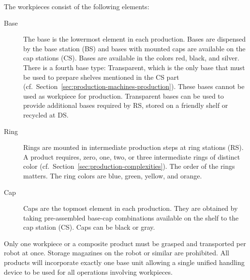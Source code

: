 \documentclass[12pt,twoside]{article}
\newcommand{\refsec}[1]{Section~\ref{#1}}
\begin{document}
\noindent
The workpieces consist of the following elements:
\begin{description}
\item[Base] The base is the lowermost element in each production.
  Bases are dispensed by the base station (BS) and bases with mounted
  caps are available on the cap stations (CS). Bases are available in
  the colors red, black, and silver. There is a fourth base type:
  Transparent, which is the only base that must be used to prepare
  shelves mentioned in the CS part
  (cf.~\refsec{sec:production-machines-production}). These bases
  cannot be used as workpiece for production. Transparent bases can be
  used to provide additional bases required by RS, stored on a
  friendly shelf or recycled at DS.
\item[Ring] Rings are mounted in intermediate production steps at ring
  stations (RS). A product requires, zero, one, two, or three
  intermediate rings of distinct color
  (cf.~\refsec{sec:production-complexities}). The order of the rings
  matters. The ring colors are blue, green, yellow, and orange.
\item[Cap] Caps are the topmost element in each production. They are
  obtained by taking pre-assembled base-cap combinations available on
  the shelf to the cap station (CS). Caps can be black or gray. 

\end{description}
Only one workpiece or a composite product must be grasped and
transported per robot at once. Storage magazines on the robot or
similar are prohibited. All products will incorporate exactly one base
unit allowing a single unified handling device to be used for all
operations involving workpieces.
\end{document}
